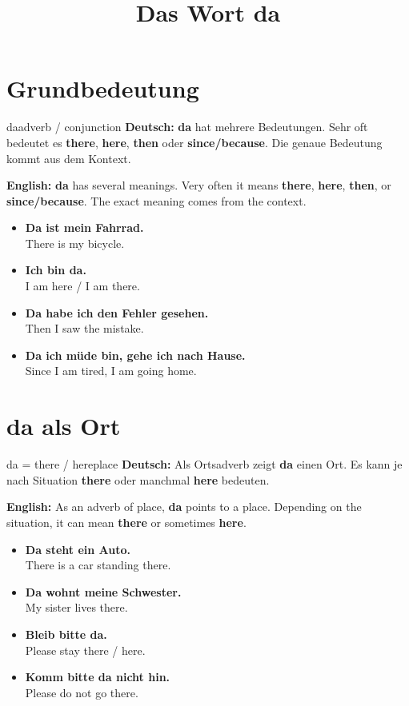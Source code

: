 \documentclass[a4paper,11pt]{article}
\title{Das Wort \glqq da\grqq}
\date{}
\newcommand{\GermanText}[1]{\textbf{Deutsch: }#1\par}
\newcommand{\EnglishText}[1]{{\small\color{SoftGray}\textbf{English: }#1\par}}
\newcommand{\ExampleItem}[2]{\item \textbf{#1}\\{\small\color{SoftGray}#2}}
\begin{document}
    \maketitle
    \tableofcontents
    \newpage

\section{Grundbedeutung}

\begin{grammarentry}{da}{adverb / conjunction}
\GermanText{\textbf{da} hat mehrere Bedeutungen. Sehr oft bedeutet es \textbf{there}, \textbf{here}, \textbf{then} oder \textbf{since/because}. Die genaue Bedeutung kommt aus dem Kontext.}
\EnglishText{\textbf{da} has several meanings. Very often it means \textbf{there}, \textbf{here}, \textbf{then}, or \textbf{since/because}. The exact meaning comes from the context.}

\begin{exbox}
\begin{itemize}
    \ExampleItem{Da ist mein Fahrrad.}{There is my bicycle.}
    \ExampleItem{Ich bin da.}{I am here / I am there.}
    \ExampleItem{Da habe ich den Fehler gesehen.}{Then I saw the mistake.}
    \ExampleItem{Da ich müde bin, gehe ich nach Hause.}{Since I am tired, I am going home.}
\end{itemize}
\end{exbox}
\end{grammarentry}

\section{da als Ort}

\begin{grammarentry}{da = there / here}{place}
\GermanText{Als Ortsadverb zeigt \textbf{da} einen Ort. Es kann je nach Situation \textbf{there} oder manchmal \textbf{here} bedeuten.}
\EnglishText{As an adverb of place, \textbf{da} points to a place. Depending on the situation, it can mean \textbf{there} or sometimes \textbf{here}.}

\begin{exbox}
\begin{itemize}
    \ExampleItem{Da steht ein Auto.}{There is a car standing there.}
    \ExampleItem{Da wohnt meine Schwester.}{My sister lives there.}
    \ExampleItem{Bleib bitte da.}{Please stay there / here.}
    \ExampleItem{Komm bitte da nicht hin.}{Please do not go there.}
\end{itemize}
\end{exbox}
\end{grammarentry}
\end{document}
